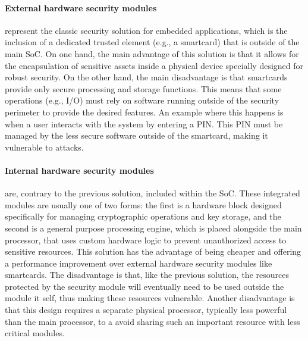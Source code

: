 \paragraph{\textbf{External hardware security modules}} represent the classic security solution for embedded applications, which is the inclusion of a dedicated trusted element (e.g., a smartcard) that is outside of the main \ac{SoC}. On one hand, the main advantage of this solution is that it allows for the encapsulation of sensitive assets inside a physical device specially designed for robust security. On the other hand, the main disadvantage is that smartcards provide only secure processing and storage functions. This means that some operations (e.g., I/O) must rely on software running outside of the security perimeter to provide the desired features. An example where this happens is when a user interacts with the system by entering a \ac{PIN}. This \ac{PIN} must be managed by the less secure software outside of the smartcard, making it vulnerable to attacks.

\paragraph{\textbf{Internal hardware security modules}} are, contrary to the previous solution, included within the \ac{SoC}. These integrated modules are usually one of two forms: the first is a hardware block designed specifically for managing cryptographic operations and key storage, and the second is a general purpose processing engine, which is placed alongside the main processor, that uses custom hardware logic to prevent unauthorized access to sensitive resources. This solution has the advantage of being cheaper and offering a performance improvement over external hardware security modules like smartcards. The disadvantage is that, like the previous solution, the resources protected by the security module will eventually need to be used outside the module it self, thus making these resources vulnerable. Another disadvantage is that this design requires a separate physical processor, typically less powerful than the main processor, to a avoid sharing such an important resource with less critical modules.


